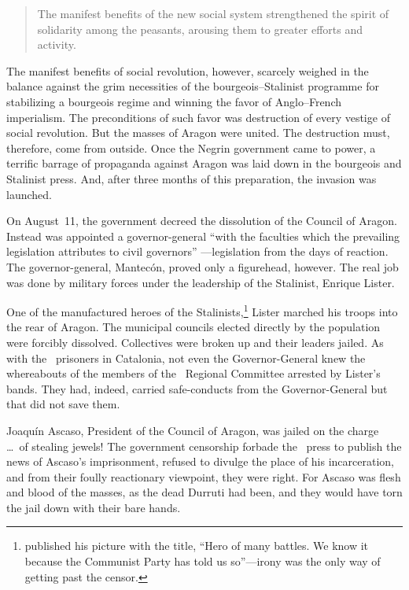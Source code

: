 \begin{quotation}
  The manifest benefits of the new social system strengthened the spirit of solidarity among the peasants, arousing them to greater efforts and activity.
\end{quotation}

\begin{sloppypar}
The manifest benefits of social revolution, however, scarcely weighed in the balance against the grim necessities of the bourgeois--Stalinist programme for stabilizing a bourgeois regime and winning the favor of Anglo--French imperialism. The preconditions of such favor was destruction of every vestige of social revolution. But the masses of Aragon were united. The destruction must, therefore, come from outside. Once the Negrin government came to power, a terrific barrage of propaganda against Aragon was laid down in the bourgeois and Stalinist press. And, after three months of this preparation, the invasion was launched.
\end{sloppypar}

On August~11, the government decreed the dissolution of the Council of Aragon. Instead was appointed a governor-general ``with the faculties which the prevailing legislation attributes to civil governors'' ---legislation from the days of reaction. The governor-general, Mantec\'on, proved only a figurehead, however. The real job was done by military forces under the leadership of the Stalinist, Enrique Lister.

One of the manufactured heroes of the Stalinists,\footnote{\emph{\CNT} published his picture with the title, ``Hero of many battles. We know it because the Communist Party has told us so''---irony was the only way of getting past the censor.} Lister marched his troops into the rear of Aragon. The municipal councils elected directly by the population were forcibly dissolved. Collectives were broken up and their leaders jailed. As with the \POUM\ prisoners in Catalonia, not even the Governor-General knew the whereabouts of the members of the \CNT\ Regional Committee arrested by Lister’s bands. They had, indeed, carried safe-conducts from the Governor-General but that did not save them.

Joaqu\'in Ascaso, President of the Council of Aragon, was jailed on the charge \dots\ of stealing jewels! The government censorship forbade the \CNT\ press to publish the news of Ascaso’s imprisonment, refused to divulge the place of his incarceration, and from their foully reactionary viewpoint, they were right. For Ascaso was flesh and blood of the masses, as the dead Durruti had been, and they would have torn the jail down with their bare hands.

